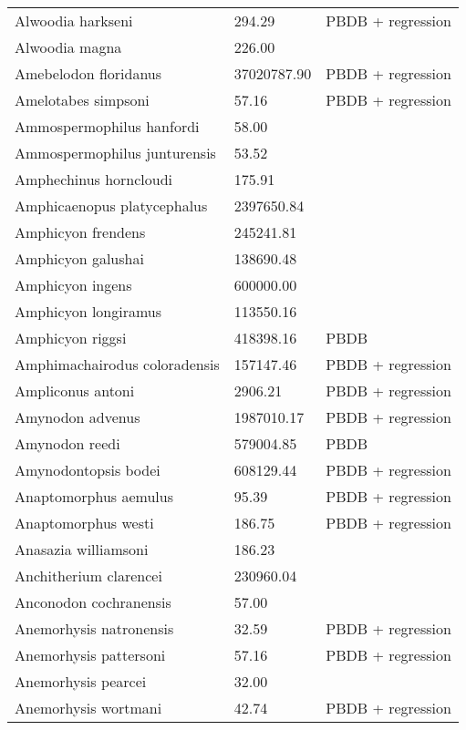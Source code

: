 \begin{center}
\begin{longtable}{p{} p{} p{} }
  Alwoodia harkseni & 294.29 & PBDB + regression \\ 
  Alwoodia magna & 226.00 & \cite{McKenna2011} \\ 
  Amebelodon floridanus & 37020787.90 & PBDB + regression \\ 
  Amelotabes simpsoni & 57.16 & PBDB + regression \\ 
  Ammospermophilus hanfordi & 58.00 & \cite{McKenna2011} \\ 
  Ammospermophilus junturensis & 53.52 & \cite{Tomiya2013} \\ 
  Amphechinus horncloudi & 175.91 & \cite{Tomiya2013} \\ 
  Amphicaenopus platycephalus & 2397650.84 & \cite{Tomiya2013} \\ 
  Amphicyon frendens & 245241.81 & \cite{Tomiya2013} \\ 
  Amphicyon galushai & 138690.48 & \cite{Tomiya2013} \\ 
  Amphicyon ingens & 600000.00 & \cite{Sorkin2008} \\ 
  Amphicyon longiramus & 113550.16 & \cite{Tomiya2013} \\ 
  Amphicyon riggsi & 418398.16 & PBDB \\ 
  Amphimachairodus coloradensis & 157147.46 & PBDB + regression \\ 
  Ampliconus antoni & 2906.21 & PBDB + regression \\ 
  Amynodon advenus & 1987010.17 & PBDB + regression \\ 
  Amynodon reedi & 579004.85 & PBDB \\ 
  Amynodontopsis bodei & 608129.44 & PBDB + regression \\ 
  Anaptomorphus aemulus & 95.39 & PBDB + regression \\ 
  Anaptomorphus westi & 186.75 & PBDB + regression \\ 
  Anasazia williamsoni & 186.23 & \cite{Williamson2012} \\ 
  Anchitherium clarencei & 230960.04 & \cite{Tomiya2013} \\ 
  Anconodon cochranensis & 57.00 & \cite{Wilson2012} \\ 
  Anemorhysis natronensis & 32.59 & PBDB + regression \\ 
  Anemorhysis pattersoni & 57.16 & PBDB + regression \\ 
  Anemorhysis pearcei & 32.00 & \cite{Albright2000} \\ 
  Anemorhysis wortmani & 42.74 & PBDB + regression \\ 

\end{longtable}
\end{center}
